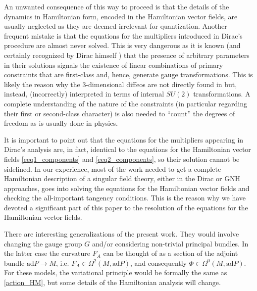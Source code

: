 \documentclass[12pt]{amsart}
\theoremstyle{plain}
\theoremstyle{definition}
\theoremstyle{remark}
\numberwithin{equation}{section}  %
\begin{document}
An unwanted consequence of this way to proceed is that the details of the dynamics in Hamiltonian form, encoded in the Hamiltonian vector fields, are usually neglected as they are deemed irrelevant for quantization. Another frequent mistake is that the equations for the multipliers introduced in Dirac's procedure are almost never solved. This is very dangerous as it is known (and certainly recognized by Dirac himself \cite{Dirac, henneaux}) that the presence of arbitrary parameters in their solutions signals the existence of linear combinations of primary constraints that are first-class and, hence, generate gauge transformations. This is likely the reason why the 3-dimensional diffeos are not directly found in \cite{HM} but, instead, (incorrectly) interpreted in terms of internal $SU(2)$ transformations. A complete understanding of the nature of the constraints (in particular regarding their first or second-class character) is also needed to ``count'' the degrees of freedom as is usually done in physics.

It is important to point out that the equations for the multipliers appearing in Dirac's analysis are, in fact, identical to the equations for the Hamiltonian vector fields  \eqref{eeq1_components} and \eqref{eeq2_components}, so their solution cannot be sidelined. In our experience, most of the work needed to get a complete Hamiltonian description of a singular field theory, either in the Dirac or GNH approaches, goes into solving the equations for the Hamiltonian vector fields and checking the all-important tangency conditions. This is the reason why we have devoted a significant part of this paper to the resolution of the equations for the Hamiltonian vector fields. 

There are interesting generalizations of the present work. They would involve changing the gauge group \(G\) and/or considering non-trivial principal bundles. In the latter case the curvature \(F_A\) can be thought of as a section of the adjoint bundle \(\mathrm{ad} P\rightarrow M\), i.e. \(F_A\in \Omega^2(M,\mathrm{ad} P)\),  and consequently \(\Phi\in  \Omega^0(M,\mathrm{ad} P)\). For these models, the variational principle would be formally the same as \eqref{action_HM}, but some details of the Hamiltonian analysis will change. 




\printbibliography
\end{document}

